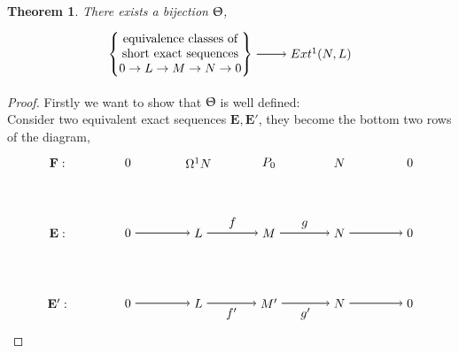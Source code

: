 \documentclass[11.5pt, twoside, a4paper, titlepage]{report}
\makeatletter
\theoremstyle{definition}
\theoremstyle{plain}
\newtheorem{thm}[mydef]{Theorem}
\newcommand{\mytab}[1]{%
\begin{tabular}{@{}c@{}}
#1
\end{tabular}
}
\makeatother
\begin{document}
\begin{thm} 
There exists a bijection $\Uptheta$,
\begin{equation*}
\begin{tikzpicture}[->,-latex, auto, main path/.style={->, semithick}, main node/.style={}]
\node [main node] 	(1) at (0,0)		{$\left\{\mytab{equivalence classes of\\ short exact sequences\\ $0\to L \to M \to N \to 0$}\right\}$};
\node [main node]			(2) at (4,0)		{$Ext^1(N,L)$};

\draw (1) edge  [->, semithick] (2);
\end{tikzpicture}
\end{equation*}
\end{thm}
\begin{proof}
Firstly we want to show that $\Uptheta$ is well defined:\\
Consider two equivalent exact sequences $\mathbf{E}, \mathbf{E'}$, they become the bottom two rows of the diagram, 
\begin{equation*}
\begin{tikzpicture}[->,-latex, auto, main path/.style={->, semithick}, main node/.style={}]
\node [main node]		(1) at (0,0)		{$\mathbf{E}:$};
\node	[main node]		(2) at (2,0)		{$0$};
\node	[main node]		(3) at (4,0)		{$L$};
\node [main node]		(4) at (6,0)		{$M$};
\node [main node]		(5) at (8,0)		{$N$};
\node	[main node]		(11) at (10,0)	{$0$};

\node [main node] 		(6) at (0,-2)		{$\mathbf{E'}:$};
\node	[main node]		(7) at (2,-2)		{$0$};
\node	[main node]		(8) at (4,-2)		{$L$};
\node [main node]		(9) at (6,-2)		{$M'$};
\node [main node]		(10) at (8,-2)	{$N$};
\node [main node]		(13) at (10,-2)	{$0$};

\node [main node] 		(14) at (0,2)		{$\mathbf{F}:$};
\node	[main node]		(15) at (2,2)		{$0$};
\node	[main node]		(16) at (4,2)		{$\Omega^1N$};
\node [main node]		(17) at (6,2)		{$P_0$};
\node [main node]		(18) at (8,2)		{$N$};
\node [main node]		(19) at (10,2)	{$0$};

\draw (2) edge [main path] node [auto] {$$} (3);
\draw (3) edge [main path] node [auto] {$f$} (4);
\draw (4) edge [main path] node [auto] {$g$} (5);
\draw (5) edge [main path] node [auto] {$$} (11);

\draw (7) edge [main path] node [auto] {$$} (8);
\path (8) edge [main path] node [auto, swap] {$f'$} (9);
\draw (9) edge [main path] node [auto, swap] {$g'$} (10);
\draw (10) edge [main path] node [auto, swap] {$$} (13);


\end{tikzpicture}
\end{equation*}
\end{proof}
\end{document}
